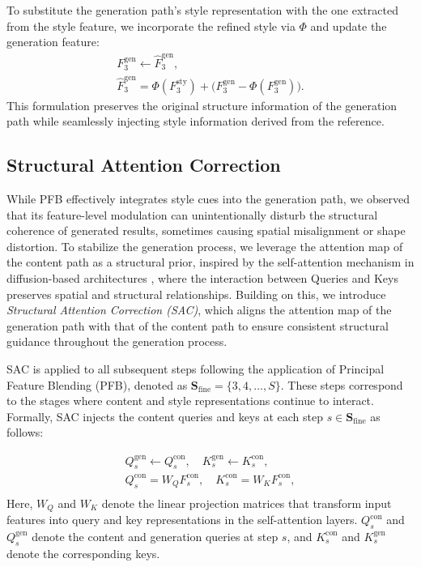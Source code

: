 \documentclass[10pt,twocolumn,letterpaper]{article}
\begin{document}
To substitute the generation path’s style representation with the one extracted from the style feature, we incorporate the refined style via $\Phi$ and update the generation feature:
\begin{equation}
	\begin{gathered}
		F_3^{\text{gen}} \leftarrow \hat{F}_3^{\text{gen}},\\
		\hat{F}_3^{\text{gen}} =
		\Phi({F}_3^{\text{sty}})
		+ \big({F}_3^{\text{gen}} - \Phi({F}_3^{\text{gen}})\big).
	\end{gathered}
\end{equation}
This formulation preserves the original structure information of the generation path while seamlessly injecting style information derived from the reference.

\subsection{Structural Attention Correction}
\label{sec:query}
While PFB effectively integrates style cues into the generation path, we observed that its feature-level modulation can unintentionally disturb the structural coherence of generated results, sometimes causing spatial misalignment or shape distortion. To stabilize the generation process, we leverage the attention map of the content path as a structural prior, inspired by the self-attention mechanism in diffusion-based architectures \cite{shin2025exploringmmdit, tumanyan2023plug}, where the interaction between Queries and Keys preserves spatial and structural relationships. 
Building on this, we introduce \textit{Structural Attention Correction (SAC)}, which aligns the attention map of the generation path with that of the content path to ensure consistent structural guidance throughout the generation process. 

SAC is applied to all subsequent steps following the application of Principal Feature Blending (PFB), denoted as $\mathbf{S}_\text{fine} = \{3,4, \dots, S\}$. 
These steps correspond to the stages where content and style representations continue to interact. Formally, SAC injects the content queries and keys at each step $s \in \mathbf{S}_\text{fine}$ as follows:

\begin{equation}
	\begin{gathered}
		Q_s^\text{gen} \leftarrow Q_s^\text{con}, \quad K_s^\text{gen} \leftarrow K_s^\text{con},\\
		Q_s^{\text{con}} = {W}_Q F_s^{\text{con}},\quad K_s^{\text{con}} = {W}_K F_s^{\text{con}}, \\[4pt]
	\end{gathered}
\end{equation}
Here, \(W_Q\) and \(W_K\) denote the linear projection matrices that transform input features into query and key representations in the self-attention layers. \(Q_s^\text{con}\) and \(Q_s^\text{gen}\) denote the content and generation queries at step \(s\), and \(K_s^\text{con}\) and \(K_s^\text{gen}\) denote the corresponding keys.
\end{document}

